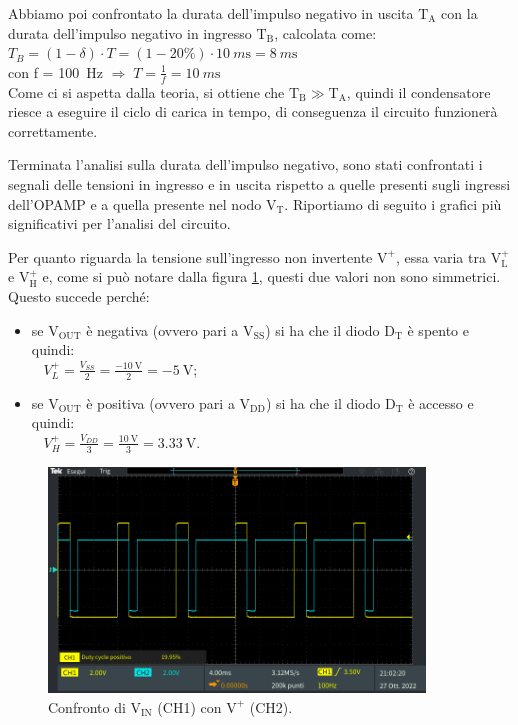 \documentclass{report}
\begin{document}
\par Abbiamo poi confrontato la durata dell'impulso negativo in uscita $\mathrm{T_A}$ con la durata dell'impulso negativo in ingresso $\mathrm{T_B}$, calcolata come:
\\[4pt]\indent$\displaystyle{T_B=(1-\delta)\cdot T=(1-20\%)\cdot\SI{10}{m\second}=\SI{8}{m\second}}$
\\[4pt]\indent con f = \SI{100}{\hertz} $\Rightarrow\;\displaystyle{T=\frac{1}{f}=\SI{10}{m\second}}$
\\[4pt]Come ci si aspetta dalla teoria, si ottiene che $\mathrm{T_B}\gg\mathrm{T_A}$, quindi il condensatore riesce a eseguire il ciclo di carica in tempo, di conseguenza il circuito funzionerà correttamente.\par
Terminata l'analisi sulla durata dell'impulso negativo, sono stati confrontati i segnali delle tensioni in ingresso e in uscita rispetto a quelle presenti sugli ingressi dell'OPAMP e a quella presente nel nodo $\mathrm{V_T}$. Riportiamo di seguito i grafici più significativi per l'analisi del circuito.\par
Per quanto riguarda la tensione sull'ingresso non invertente $\mathrm{V^+}$, essa varia tra $\mathrm{V_L^+}$ e $\mathrm{V_H^+}$ e, come si può notare dalla figura \ref{figura:TEK00003}, questi due valori non sono simmetrici. Questo succede perché:
\begin{itemize}
	\item se $\mathrm{V_{OUT}}$ è negativa (ovvero pari a $\mathrm{V_{SS}}$) si ha che il diodo $\mathrm{D_T}$ è spento e quindi:
	\\[4pt]$\displaystyle{\;\;\;V_L^+=\frac{V_{SS}}{2}=\frac{\SI{-10}{\volt}}{2}=\SI{-5}{\volt}}$;
	\item se $\mathrm{V_{OUT}}$ è positiva (ovvero pari a $\mathrm{V_{DD}}$) si ha che il diodo $\mathrm{D_T}$ è accesso e quindi:
	\\[4pt]$\displaystyle{\;\;\;V_H^+=\frac{V_{DD}}{3}=\frac{\SI{10}{\volt}}{3}=\SI{3.33}{\volt}}$.
\end{itemize}
\begin{figure}[h!]
	\centering
	\includegraphics[height=6cm]{immagini/TEK00003}
	\caption{Confronto di $\mathrm{V_{IN}}$ (CH1) con $\mathrm{V^+}$ (CH2).}
	\label{figura:TEK00003}
\end{figure}
\end{document}

